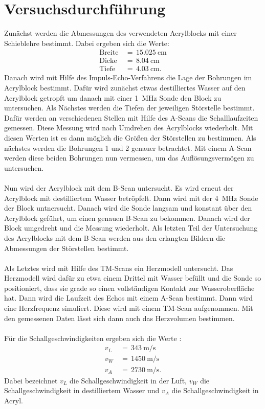 \documentclass[
  bibliography=totoc,     %
  captions=tableheading,  %
  titlepage=firstiscover, %
]{scrartcl}
\begin{document}
\section{Versuchsdurchführung}
\label{sec:versuchsdurchführung}
Zunächst werden die Abmessungen des verwendeten Acrylblocks mit einer
Schieblehre
bestimmt. Dabei ergeben sich die Werte:
\begin{align*}
  \text{Breite}\,&=\,\SI{15.025}{\centi\meter} \\
  \text{Dicke}\,&=\,\SI{8.04}{\centi\meter} \\
  \text{Tiefe}\,&=\,\SI{4.03}{\centi\meter}.
\end{align*}
Danach wird mit Hilfe des Impuls-Echo-Verfahrens die Lage der Bohrungen im
Acrylblock bestimmt. Dafür wird zunächst etwas destilliertes Wasser auf den
Acrylblock getropft um danach mit einer \SI{1}{\mega\hertz} Sonde den Block zu
untersuchen.
Als Nächstes werden die Tiefen der jeweiligen Störstelle bestimmt. Dafür
werden an verschiedenen Stellen mit Hilfe des A-Scans die Schalllaufzeiten
gemessen. Diese Messung wird nach Umdrehen des Acrylblocks wiederholt. Mit
diesen Werten ist es dann möglich die Größen der Störstellen zu bestimmen.
Als nächstes werden die Bohrungen 1 und 2 genauer betrachtet. Mit einem A-Scan
werden diese beiden Bohrungen nun vermessen, um das Auflösungsvermögen zu
untersuchen.\\
\\
Nun wird der Acrylblock mit dem B-Scan untersucht. Es wird erneut der
Acrylblock mit destilliertem Wasser betröpfelt. Dann wird mit der
\SI{4}{\mega\hertz} Sonde der Block untnersucht. Danach wird die Sonde langsam
und konstant über den Acrylblock geführt, um einen genauen B-Scan zu bekommen.
Danach wird der Block umgedreht und die Messung wiederholt. Als letzten Teil
der Untersuchung des Acrylblocks mit dem B-Scan werden aus den erlangten
Bildern die Abmessungen der Störstellen bestimmt. \\
\\
Als Letztes wird mit Hilfe des TM-Scans ein Herzmodell untersucht. Das
Herzmodell wird dafür zu etwa einem Drittel mit Wasser befüllt und die Sonde so
positioniert, dass sie grade so einen vollständigen Kontakt zur
Wasseroberfläche hat.
Dann wird die Laufzeit des Echos mit einem A-Scan bestimmt. Dann wird eine
Herzfrequenz simuliert. Diese wird mit einem TM-Scan
aufgenommen. Mit den gemessenen Daten lässt sich dann auch das Herzvolumen
bestimmen.\\
\\
Für die Schallgeschwindigkeiten ergeben sich die Werte \cite{olympus} \cite{spektrum}:
\begin{align*}
  v_L\,&=\,\SI{343}{\meter\per\second} \\
  v_W\,&=\,\SI{1450}{\meter\per\second} \\
  v_A\,&=\,\SI{2730}{\meter\per\second}.
\end{align*}
Dabei bezeichnet $v_L$ die Schallgeschwindigkeit in der Luft, $v_W$ die
Schallgeschwindigkeit in destilliertem Wasser und $v_A$ die
Schallgeschwindigkeit in Acryl.
\clearpage
\end{document}

